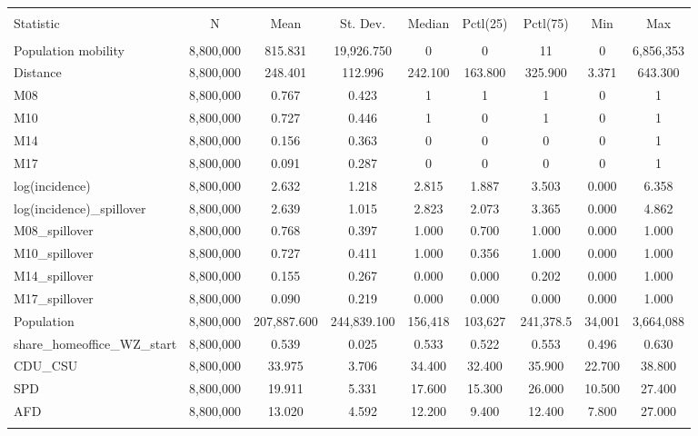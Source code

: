 \documentclass[10pt,a4paper]{article}
\author{Peer Lasse Hinrichsen}
\begin{document}
\begin{landscape}
\begin{table}[!htbp] \centering 
  \caption{} 
  \label{} 
\begin{tabular}{@{\extracolsep{5pt}}lcccccccc} 
\\[-1.8ex]\hline 
\hline \\[-1.8ex] 
Statistic & \multicolumn{1}{c}{N} & \multicolumn{1}{c}{Mean} & \multicolumn{1}{c}{St. Dev.} & \multicolumn{1}{c}{Median} & \multicolumn{1}{c}{Pctl(25)} & \multicolumn{1}{c}{Pctl(75)} & \multicolumn{1}{c}{Min} & \multicolumn{1}{c}{Max} \\ 
\hline \\[-1.8ex] 
Population mobility & 8,800,000 & 815.831 & 19,926.750 & 0 & 0 & 11 & 0 & 6,856,353 \\ 
Distance & 8,800,000 & 248.401 & 112.996 & 242.100 & 163.800 & 325.900 & 3.371 & 643.300 \\ 
M08 & 8,800,000 & 0.767 & 0.423 & 1 & 1 & 1 & 0 & 1 \\ 
M10 & 8,800,000 & 0.727 & 0.446 & 1 & 0 & 1 & 0 & 1 \\ 
M14& 8,800,000 & 0.156 & 0.363 & 0 & 0 & 0 & 0 & 1 \\ 
M17 & 8,800,000 & 0.091 & 0.287 & 0 & 0 & 0 & 0 & 1 \\ 
log(incidence) & 8,800,000 & 2.632 & 1.218 & 2.815 & 1.887 & 3.503 & 0.000 & 6.358 \\ 
log(incidence)\_spillover & 8,800,000 & 2.639 & 1.015 & 2.823 & 2.073 & 3.365 & 0.000 & 4.862 \\ 
M08\_spillover & 8,800,000 & 0.768 & 0.397 & 1.000 & 0.700 & 1.000 & 0.000 & 1.000 \\ 
M10\_spillover & 8,800,000 & 0.727 & 0.411 & 1.000 & 0.356 & 1.000 & 0.000 & 1.000 \\ 
M14\_spillover & 8,800,000 & 0.155 & 0.267 & 0.000 & 0.000 & 0.202 & 0.000 & 1.000 \\ 
M17\_spillover & 8,800,000 & 0.090 & 0.219 & 0.000 & 0.000 & 0.000 & 0.000 & 1.000 \\ 
Population & 8,800,000 & 207,887.600 & 244,839.100 & 156,418 & 103,627 & 241,378.5 & 34,001 & 3,664,088 \\ 
share\_homeoffice\_WZ\_start  & 8,800,000 & 0.539 & 0.025 & 0.533 & 0.522 & 0.553 & 0.496 & 0.630 \\ 
CDU\_CSU & 8,800,000 & 33.975 & 3.706 & 34.400 & 32.400 & 35.900 & 22.700 & 38.800 \\ 
SPD & 8,800,000 & 19.911 & 5.331 & 17.600 & 15.300 & 26.000 & 10.500 & 27.400 \\ 
AFD & 8,800,000 & 13.020 & 4.592 & 12.200 & 9.400 & 12.400 & 7.800 & 27.000 \\ 
\hline \\[-1.8ex] 
\end{tabular} 
\end{table} 
\end{landscape}
\end{document}

